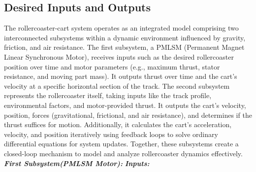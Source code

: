 \documentclass{article}
\begin{document}
    \subsection{Desired Inputs and Outputs}
    The rollercoaster-cart system operates as an integrated model comprising two
    interconnected subsystems within a dynamic environment influenced by gravity,
    friction, and air resistance. The first subsystem, a PMLSM (Permanent Magnet
    Linear Synchronous Motor), receives inputs such as the desired rollercoaster
    position over time and motor parameters (e.g., maximum thrust, stator
    resistance, and moving part mass). It outputs thrust over time and the cart's
    velocity at a specific horizontal section of the track. The second subsystem
    represents the rollercoaster itself, taking inputs like the track profile,
    environmental factors, and motor-provided thrust. It outputs the cart's
    velocity, position, forces (gravitational, frictional, and air resistance), and
    determines if the thrust suffices for motion. Additionally, it calculates the
    cart's acceleration, velocity, and position iteratively using feedback loops
    to solve ordinary differential equations for system updates. Together, these
    subsystems create a closed-loop mechanism to model and analyze rollercoaster
    dynamics effectively.
    \newline
    \newline
    \textbf{\textit{First Subsystem(PMLSM Motor):}}
    \newline
    \textbf{\textit{Inputs:}}
\end{document}
